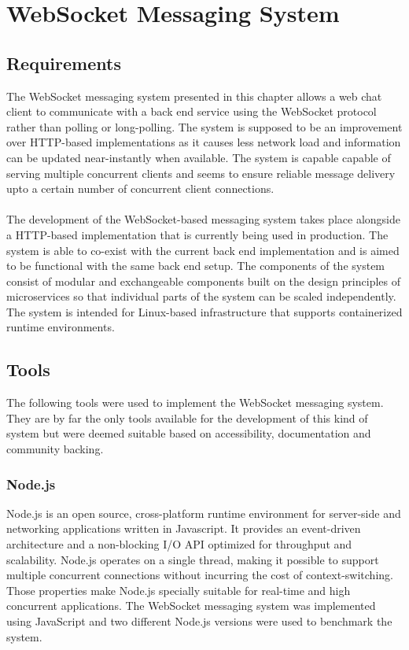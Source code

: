 \chapter{WebSocket Messaging System}
\label{chapter:websocketMessagingSystem}

\section{Requirements}

The WebSocket messaging system presented in this chapter allows a web chat client to communicate with a back end service using the WebSocket protocol rather than polling or long-polling. The system is supposed to be an improvement over HTTP-based implementations as it causes less network load and information can be updated near-instantly when available. The system is capable capable of serving multiple concurrent clients and seems to ensure reliable message delivery upto a certain number of concurrent client connections.
\\ \\
The development of the WebSocket-based messaging system takes place alongside a HTTP-based implementation that is currently being used in production. The system is able to co-exist with the current back end implementation and is aimed to be functional with the same back end setup. The components of the system consist of modular and exchangeable components built on the design principles of microservices so that individual parts of the system can be scaled independently. The system is intended for Linux-based infrastructure that supports containerized runtime environments.

\section{Tools}

The following tools were used to implement the WebSocket messaging system. They are by far the only tools available for the development of this kind of system but were deemed suitable based on accessibility, documentation and community backing.

\subsection{Node.js}

Node.js is an open source, cross-platform runtime environment for server-side and networking applications written in Javascript. It provides an event-driven architecture and a non-blocking I/O API optimized for throughput and scalability. Node.js operates on a single thread, making it possible to support multiple concurrent connections without incurring the cost of context-switching. Those properties make Node.js specially suitable for real-time and high concurrent applications. The WebSocket messaging system was implemented using JavaScript and two different Node.js versions were used to benchmark the system.

